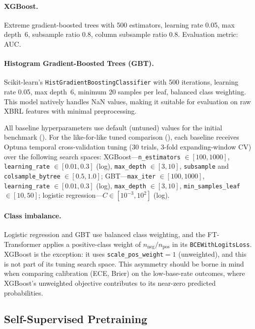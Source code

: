 \paragraph{XGBoost.} Extreme gradient-boosted trees \citep{chen2016xgboost} with 500 estimators, learning rate 0.05, max depth~6, subsample ratio 0.8, column subsample ratio 0.8. Evaluation metric: AUC.

\paragraph{Histogram Gradient-Boosted Trees (GBT).} Scikit-learn's \texttt{HistGradientBoosting\-Class\-i\-fier} with 500 iterations, learning rate 0.05, max depth~6, minimum 20 samples per leaf, balanced class weighting. This model natively handles NaN values, making it suitable for evaluation on raw XBRL features with minimal preprocessing.

All baseline hyperparameters use default (untuned) values for the initial benchmark (). For the like-for-like tuned comparison (), each baseline receives Optuna temporal cross-validation tuning (30 trials, 3-fold expanding-window CV) over the following search spaces: XGBoost---\texttt{n\_estimators} $\in [100, 1000]$, \texttt{learning\_rate} $\in [0.01, 0.3]$ (log), \texttt{max\_depth} $\in [3, 10]$, \texttt{subsample} and \texttt{colsample\_bytree} $\in [0.5, 1.0]$; GBT---\texttt{max\_iter} $\in [100, 1000]$, \texttt{learning\_rate} $\in [0.01, 0.3]$ (log), \texttt{max\_depth} $\in [3, 10]$, \texttt{min\_samples\_leaf} $\in [10, 50]$; logistic regression---$C \in [10^{-3}, 10^{2}]$ (log).

\paragraph{Class imbalance.} Logistic regression and GBT use balanced class weighting, and the FT-Transformer applies a positive-class weight of $n_{\text{neg}}/n_{\text{pos}}$ in its \texttt{BCEWithLogitsLoss}. XGBoost is the exception: it uses \texttt{scale\_pos\_weight}${}=1$ (unweighted), and this is not part of its tuning search space. This asymmetry should be borne in mind when comparing calibration (ECE, Brier) on the low-base-rate outcomes, where XGBoost's unweighted objective contributes to its near-zero predicted probabilities.

\subsection{Self-Supervised Pretraining}
\label{sec:ssl}

